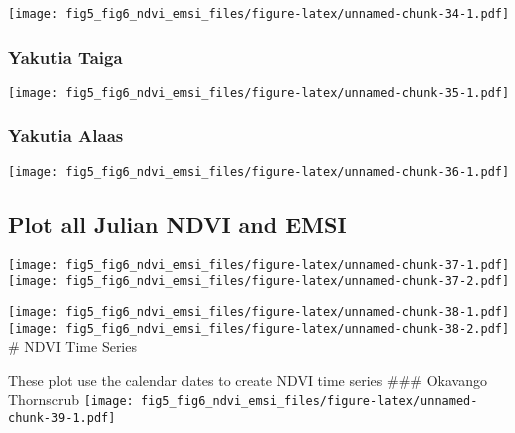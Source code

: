 \documentclass[
]{article}
\begin{document}
\texttt{[image: fig5\_fig6\_ndvi\_emsi\_files/figure-latex/unnamed-chunk-34-1.pdf]}

\hypertarget{htmlwidget-0a6658adaa47528052a6}{}
\begin{plotly}

\end{plotly}

\hypertarget{yakutia-taiga-1}{%
\subsubsection{Yakutia Taiga}\label{yakutia-taiga-1}}

\texttt{[image: fig5\_fig6\_ndvi\_emsi\_files/figure-latex/unnamed-chunk-35-1.pdf]}

\hypertarget{htmlwidget-59bd6d40a3e0866375b0}{}
\begin{plotly}

\end{plotly}

\hypertarget{yakutia-alaas-1}{%
\subsubsection{Yakutia Alaas}\label{yakutia-alaas-1}}

\texttt{[image: fig5\_fig6\_ndvi\_emsi\_files/figure-latex/unnamed-chunk-36-1.pdf]}

\hypertarget{htmlwidget-abcac8ae7ecd1dd5771f}{}
\begin{plotly}

\end{plotly}

\hypertarget{plot-all-julian-ndvi-and-emsi}{%
\subsection{Plot all Julian NDVI and
EMSI}\label{plot-all-julian-ndvi-and-emsi}}

\texttt{[image: fig5\_fig6\_ndvi\_emsi\_files/figure-latex/unnamed-chunk-37-1.pdf]}
\texttt{[image: fig5\_fig6\_ndvi\_emsi\_files/figure-latex/unnamed-chunk-37-2.pdf]}

\texttt{[image: fig5\_fig6\_ndvi\_emsi\_files/figure-latex/unnamed-chunk-38-1.pdf]}
\texttt{[image: fig5\_fig6\_ndvi\_emsi\_files/figure-latex/unnamed-chunk-38-2.pdf]}
\# NDVI Time Series

These plot use the calendar dates to create NDVI time series \#\#\#
Okavango Thornscrub
\texttt{[image: fig5\_fig6\_ndvi\_emsi\_files/figure-latex/unnamed-chunk-39-1.pdf]}
\end{document}
